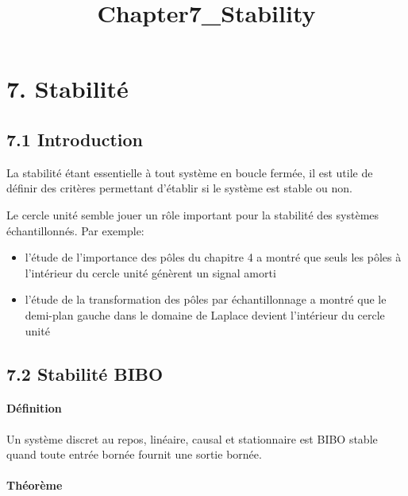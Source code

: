 \documentclass[11pt]{article}
\title{Chapter7\_Stability}
\providecommand{\tightlist}{%
      \setlength{\itemsep}{0pt}\setlength{\parskip}{0pt}}
\begin{document}
    
    \maketitle
    
    

    
    \section{7. Stabilité}\label{stabilituxe9}

    \subsection{7.1 Introduction}\label{introduction}

    La stabilité étant essentielle à tout système en boucle fermée, il est
utile de définir des critères permettant d'établir si le système est
stable ou non.

    Le cercle unité semble jouer un rôle important pour la stabilité des
systèmes échantillonnés. Par exemple:

\begin{itemize}
\tightlist
\item
  l'étude de l'importance des pôles du chapitre 4 a montré que seuls les
  pôles à l'intérieur du cercle unité génèrent un signal amorti
\item
  l'étude de la transformation des pôles par échantillonnage a montré
  que le demi-plan gauche dans le domaine de Laplace devient l'intérieur
  du cercle unité
\end{itemize}

    \subsection{7.2 Stabilité BIBO}\label{stabilituxe9-bibo}

    \paragraph{Définition}\label{duxe9finition}

Un système discret au repos, linéaire, causal et stationnaire est BIBO
stable quand toute entrée bornée fournit une sortie bornée.

    \paragraph{Théorème}\label{thuxe9oruxe8me}
\end{document}
